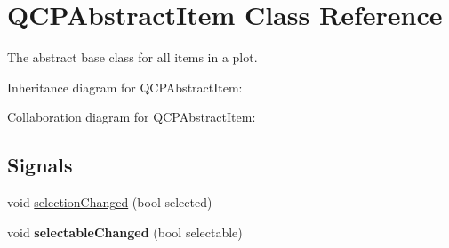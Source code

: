 \hypertarget{classQCPAbstractItem}{}\section{Q\+C\+P\+Abstract\+Item Class Reference}
\label{classQCPAbstractItem}


The abstract base class for all items in a plot.  




Inheritance diagram for Q\+C\+P\+Abstract\+Item\+:


Collaboration diagram for Q\+C\+P\+Abstract\+Item\+:
\subsection*{Signals}
\begin{DoxyCompactItemize}
\item 
void \hyperlink{classQCPAbstractItem_aa5cffb034fc65dbb91c77e02c1c14251}{selection\+Changed} (bool selected)
\item 
void {\bfseries selectable\+Changed} (bool selectable)\hypertarget{classQCPAbstractItem_a5b266c11aac61cb511901f3911dac2a3}{}\label{classQCPAbstractItem_a5b266c11aac61cb511901f3911dac2a3}

\end{DoxyCompactItemize}
